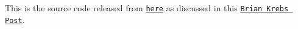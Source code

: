 This is the source code released from \href{http://hackforums.net/showthread.php?tid=5420472}{\tt here} as discussed in this \href{https://krebsonsecurity.com/2016/10/source-code-for-iot-botnet-mirai-released/}{\tt Brian Krebs Post}. 